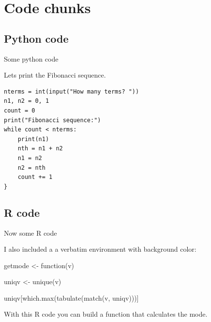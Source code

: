 \section{Code chunks}

\subsection{Python code}


\begin{frame}[fragile]{Some python code}

Lets print the Fibonacci sequence. 

\begin{verbatim}
nterms = int(input("How many terms? "))
n1, n2 = 0, 1
count = 0
print("Fibonacci sequence:")
while count < nterms:
    print(n1)
    nth = n1 + n2
    n1 = n2
    n2 = nth
    count += 1
}
\end{verbatim}

\end{frame}

\subsection{R code}


\begin{frame}[fragile]{Now some R code}

I also included a a verbatim environment with background color:

\begin{cverbatim}
getmode <- function(v) {
  
  uniqv <- unique(v)
  
  uniqv[which.max(tabulate(match(v, uniqv)))]
  
}
\end{cverbatim}

With this R code you can build a function that calculates the mode.

\end{frame}



















